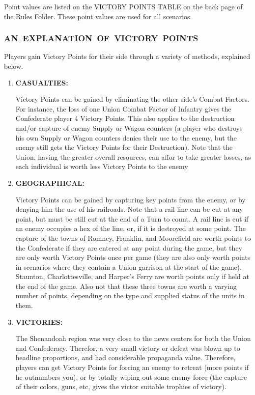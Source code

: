 Point values are listed on the VICTORY POINTS TABLE on the back page of the Rules Folder. These point values are used for all scenarios.

\subsubsection{\mbox{\footnotesize AN EXPLANATION OF VICTORY POINTS}}

Players gain Victory Points for their side through a variety of methods, explained below.

\begin{enumerate}
  \item \textbf{CASUALTIES:}

  Victory Points can be gained by eliminating the other side's Combat Factors. For instance, the loss of one Union Combat Factor of Infantry gives the Confederate player 4 Victory Points. This also applies to the destruction and/or capture of enemy Supply or Wagon counters (a player who destroys his own Supply or Wagon counters denies their use to the enemy, but the enemy still gets the Victory Points for their Destruction). Note that the Union, having the greater overall resources, can affor to take greater losses, as each individual is worth less Victory Points to the enemy

  \item \textbf{GEOGRAPHICAL:}

  Victory Points can be gained by capturing key points from the enemy, or by denying him the use of his railroads. Note that a rail line can be cut at any point, but must be still cut at the end of a Turn to count. A rail line is cut if an enemy occupies a hex of the line, or, if it is destroyed at some point. The capture of the towns of Romney, Franklin, and Moorefield are worth points to the Confederate if they are entered at any point during the game, but they are only worth Victory Points once per game (they are also only worth points in scenarios where they contain a Union garrison at the start of the game). Staunton, Charlottesville, and Harper's Ferry are worth points only if held at the end of the game. Also not that these three towns are worth a varying number of points, depending on the type and supplied status of the units in them.

  \item \textbf{VICTORIES:}

  The Shenandoah region was very close to the news centers for both the Union and Confederacy. Therefor, a very small victory or defeat was blown up to headline proportions, and had considerable propaganda value. Therefore, players can get Victory Points for forcing an enemy to retreat (more points if he outnumbers you), or by totally wiping out some enemy force (the capture of their colors, guns, etc, gives the victor suitable trophies of victory).


\end{enumerate}
